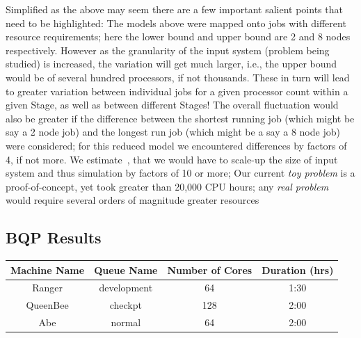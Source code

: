 \documentclass[conference,final]{IEEEtran}
\newcommand{\jha}[0]{}
\begin{document}

Simplified as the above may seem there are a few important salient
points that need to be highlighted: The models above were mapped onto
jobs with different resource requirements; here the lower bound and
upper bound are 2 and 8 nodes respectively. However as the granularity
of the input system (problem being studied) is increased, the
variation will get much larger, i.e., the upper bound would be of
several hundred processors, if not thousands. These in turn will lead
to greater variation between individual jobs for a given processor
count within a given Stage, as well as between different Stages!  The
overall fluctuation would also be greater if the difference between
the shortest running job (which might be say a 2 node job) and the
longest run job (which might be a say a 8 node job) were considered;
for this reduced model we encountered differences by factors of 4, if
not more.  We estimate~\cite{DO2007}, that we would have to scale-up
the size of input system and thus simulation by factors of 10 or more;
Our current {\it toy problem} is a proof-of-concept, yet took greater
than 20,000 CPU hours; any {\it real problem} would require several
orders of magnitude greater resources

\subsection{BQP Results}

\begin{tabular}{|c|c|c|c|}
\hline Machine Name & Queue Name & Number of Cores & Duration (hrs) \\ 
\hline Ranger & development & 64 & 1:30 \\ 
\hline QueenBee & checkpt & 128 & 2:00 \\ 
\hline Abe & normal & 64 & 2:00 \\ 
\hline 
\end{tabular} 
\end{document}
